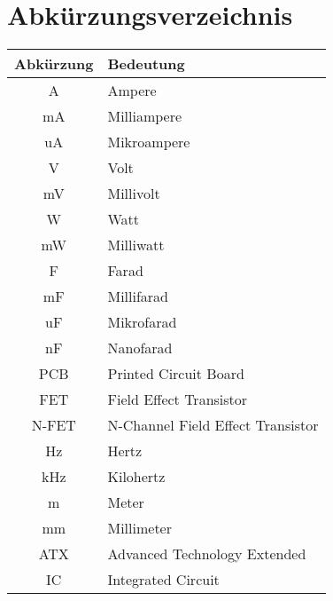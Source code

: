 
\section{Abk\"urzungsverzeichnis}

\begin{tabular}{|c|l|}
\hline
\textbf{Abk\"urzung} & \textbf{Bedeutung} \\
\hline
A & Ampere \\
mA & Milliampere \\
uA & Mikroampere \\
V & Volt \\
mV & Millivolt \\
W & Watt \\
mW & Milliwatt \\
F & Farad \\
mF & Millifarad \\
uF & Mikrofarad \\
nF & Nanofarad \\
PCB & Printed Circuit Board \\
FET & Field Effect Transistor \\
N-FET & N-Channel Field Effect Transistor \\
Hz & Hertz \\
kHz & Kilohertz \\
m & Meter \\
mm & Millimeter \\
ATX & Advanced Technology Extended \\
IC & Integrated Circuit \\
\hline
\end{tabular}
